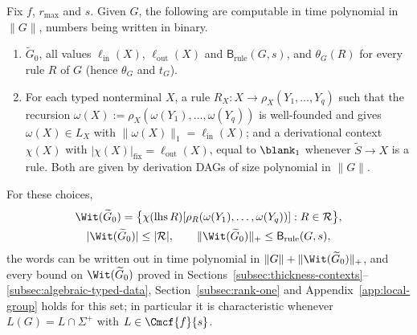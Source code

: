\begin{proposition}
\label{prop:effective-char-data}
\label{prop:computed-witness-budget}
\label{prop:rule-only-witnesses}
Fix $f$, $r_{\max}$ and $s$.  Given $G$, the following are computable in time
polynomial in $\|G\|$, numbers being written in binary.
\begin{enumerate}[label=\textup{(\roman*)},leftmargin=*]
\item $\widetilde G_0$, all values $\ell_{\mathrm{in}}(X)$, $\ell_{\mathrm{out}}(X)$
and $\mathsf B_{\mathrm{rule}}(G,s)$, and $\theta_G(R)$ for every rule $R$ of $G$ (hence
$\theta_G$ and $t_G$).
\item For each typed nonterminal $X$, a rule $R_X:X\to\rho_X(Y_1,\ldots,Y_q)$ such
that the recursion $\omega(X):=\rho_X(\omega(Y_1),\ldots,\omega(Y_q))$ is
well-founded and gives $\omega(X)\in L_X$ with $\|\omega(X)\|_1=\ell_{\mathrm{in}}(X)$;
and a derivational context $\chi(X)$ with $|\chi(X)|_{\mathrm{fix}}=\ell_{\mathrm{out}}(X)$,
equal to $\blank_1$ whenever $\widetilde S\to X$ is a rule.  Both are given by
derivation DAGs of size polynomial in $\|G\|$.
\end{enumerate}
For these choices,
\[
 \begin{gathered}
 \Wit(\widetilde G_0)=\bigl\{\chi(\operatorname{lhs}R)[\rho_R(\omega(Y_1),\ldots,\omega(Y_q))]:
 R\in\mathcal R\bigr\},\\
 |\Wit(\widetilde G_0)|\le|\mathcal R|,\qquad
 \|\Wit(\widetilde G_0)\|_+\le\mathsf B_{\mathrm{rule}}(G,s),
 \end{gathered}
\]
the words can be written out in time polynomial in
$\|G\|+\|\Wit(\widetilde G_0)\|_+$, and every bound on $\Wit(\widetilde G_0)$ proved in
Sections~\ref{subsec:thickness-contexts}--\ref{subsec:algebraic-typed-data},
Section~\ref{subsec:rank-one} and Appendix~\ref{app:local-group} holds for this set;
in particular it is characteristic whenever $L(G)=L\cap\Sigma^+$ with
$L\in\Cmcf{f}{s}$.
\end{proposition}

